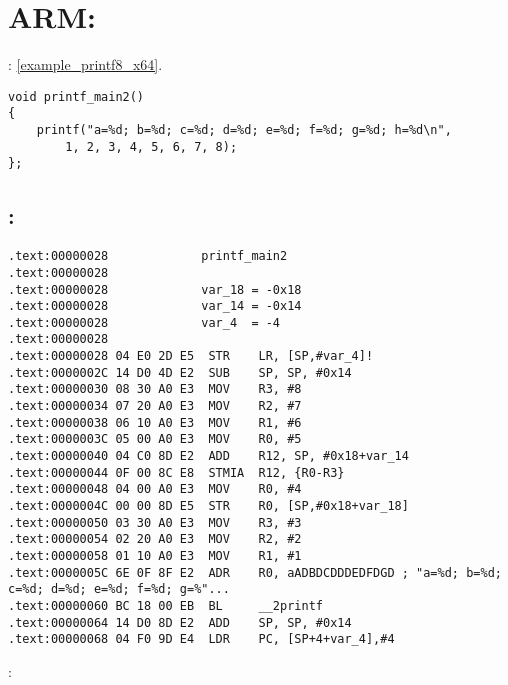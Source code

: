 \section{ARM: }

: \ref{example_printf8_x64}.

\begin{lstlisting}
void printf_main2()
{
    printf("a=%d; b=%d; c=%d; d=%d; e=%d; f=%d; g=%d; h=%d\n", 
        1, 2, 3, 4, 5, 6, 7, 8);
};
\end{lstlisting}

\subsection{\OptimizingKeil: \ARMMode}

\begin{lstlisting}
.text:00000028             printf_main2
.text:00000028
.text:00000028             var_18 = -0x18
.text:00000028             var_14 = -0x14
.text:00000028             var_4  = -4
.text:00000028
.text:00000028 04 E0 2D E5  STR    LR, [SP,#var_4]!
.text:0000002C 14 D0 4D E2  SUB    SP, SP, #0x14
.text:00000030 08 30 A0 E3  MOV    R3, #8
.text:00000034 07 20 A0 E3  MOV    R2, #7
.text:00000038 06 10 A0 E3  MOV    R1, #6
.text:0000003C 05 00 A0 E3  MOV    R0, #5
.text:00000040 04 C0 8D E2  ADD    R12, SP, #0x18+var_14
.text:00000044 0F 00 8C E8  STMIA  R12, {R0-R3}
.text:00000048 04 00 A0 E3  MOV    R0, #4
.text:0000004C 00 00 8D E5  STR    R0, [SP,#0x18+var_18]
.text:00000050 03 30 A0 E3  MOV    R3, #3
.text:00000054 02 20 A0 E3  MOV    R2, #2
.text:00000058 01 10 A0 E3  MOV    R1, #1
.text:0000005C 6E 0F 8F E2  ADR    R0, aADBDCDDDEDFDGD ; "a=%d; b=%d; c=%d; d=%d; e=%d; f=%d; g=%"...
.text:00000060 BC 18 00 EB  BL     __2printf
.text:00000064 14 D0 8D E2  ADD    SP, SP, #0x14
.text:00000068 04 F0 9D E4  LDR    PC, [SP+4+var_4],#4
\end{lstlisting}

:

